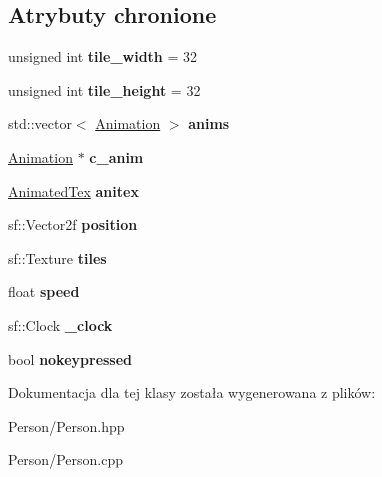 \subsection*{Atrybuty chronione}
\begin{DoxyCompactItemize}
\item 
\hypertarget{class_person_a1bd723ea6f8354ec72e12fee11fa9332}{unsigned int {\bfseries tile\-\_\-width} = 32}\label{class_person_a1bd723ea6f8354ec72e12fee11fa9332}

\item 
\hypertarget{class_person_aa4926741da1d4a3fbd6d0bbbb470d686}{unsigned int {\bfseries tile\-\_\-height} = 32}\label{class_person_aa4926741da1d4a3fbd6d0bbbb470d686}

\item 
\hypertarget{class_person_ae5ecab2c8c2ed255471a96950b4f2613}{std\-::vector$<$ \hyperlink{class_animation}{Animation} $>$ {\bfseries anims}}\label{class_person_ae5ecab2c8c2ed255471a96950b4f2613}

\item 
\hypertarget{class_person_a1e896a1f37c24902ac249054e417a9ba}{\hyperlink{class_animation}{Animation} $\ast$ {\bfseries c\-\_\-anim}}\label{class_person_a1e896a1f37c24902ac249054e417a9ba}

\item 
\hypertarget{class_person_a0aeec423efaff041da2c2c3f294188db}{\hyperlink{class_animated_tex}{Animated\-Tex} {\bfseries anitex}}\label{class_person_a0aeec423efaff041da2c2c3f294188db}

\item 
\hypertarget{class_person_acadff114ae4d9af3f0b7028ef2dc29ff}{sf\-::\-Vector2f {\bfseries position}}\label{class_person_acadff114ae4d9af3f0b7028ef2dc29ff}

\item 
\hypertarget{class_person_aa11da6001bcd048c58e0834c8eac5482}{sf\-::\-Texture {\bfseries tiles}}\label{class_person_aa11da6001bcd048c58e0834c8eac5482}

\item 
\hypertarget{class_person_ae5469c578d5fd5feeac3a2214c7abcf4}{float {\bfseries speed}}\label{class_person_ae5469c578d5fd5feeac3a2214c7abcf4}

\item 
\hypertarget{class_person_aa94ea02cfb24c2c04f010a26dc4add17}{sf\-::\-Clock {\bfseries \-\_\-clock}}\label{class_person_aa94ea02cfb24c2c04f010a26dc4add17}

\item 
\hypertarget{class_person_a3ee72122d68f4472c7c421868b974a6c}{bool {\bfseries nokeypressed}}\label{class_person_a3ee72122d68f4472c7c421868b974a6c}

\end{DoxyCompactItemize}


Dokumentacja dla tej klasy została wygenerowana z plików\-:\begin{DoxyCompactItemize}
\item 
Person/Person.\-hpp\item 
Person/Person.\-cpp\end{DoxyCompactItemize}
